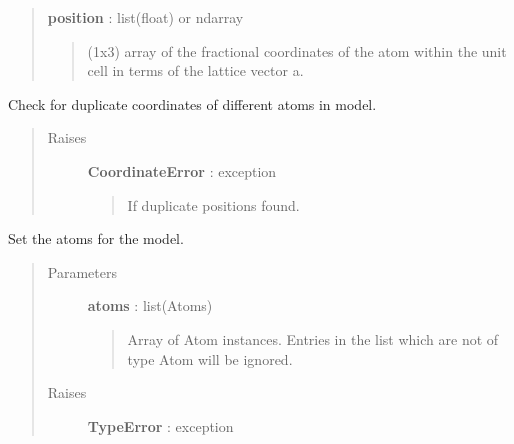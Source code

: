 \documentclass[letterpaper,10pt,english]{sphinxmanual}
\begin{document}
\begin{fulllineitems}
\begin{fulllineitems}
\begin{quote}
\begin{description}
\textbf{position} : list(float) or ndarray
\begin{quote}

(1x3) array of the fractional coordinates of the atom
within the unit cell in terms of the lattice vector a.
\end{quote}

\end{description}\end{quote}

\end{fulllineitems}


\begin{fulllineitems}
\label{modules:phaseshifts.model.Model.check_coordinates}
Check for duplicate coordinates of different atoms in model.
\begin{quote}\begin{description}
\item[{Raises}] \leavevmode
\textbf{CoordinateError} : exception
\begin{quote}

If duplicate positions found.
\end{quote}

\end{description}\end{quote}

\end{fulllineitems}


\begin{fulllineitems}
\label{modules:phaseshifts.model.Model.set_atoms}
Set the atoms for the model.
\begin{quote}\begin{description}
\item[{Parameters}] \leavevmode
\textbf{atoms} : list(Atoms)
\begin{quote}

Array of Atom instances. Entries in the list which are
not of type Atom will be ignored.
\end{quote}

\item[{Raises}] \leavevmode
\textbf{TypeError} : exception
\begin{quote}


\end{quote}
\end{description}
\end{quote}
\end{fulllineitems}
\end{fulllineitems}
\end{document}
